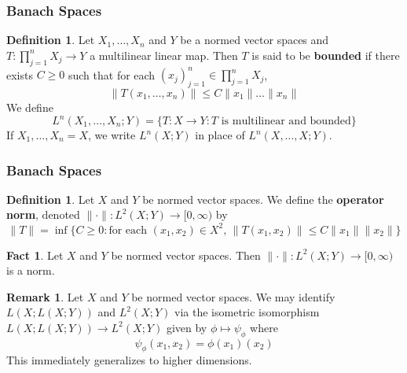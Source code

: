 \documentclass[notheorems]{beamer}
\theoremstyle{definition}
\newtheorem{defn}[definition]{Definition}
\newtheorem{fact}[definition]{Fact}
\newtheorem{rem}[definition]{Remark}
\begin{document}
	
	
	
	
	
	
	
	
	
	
	
	
	
	
	
	
	
	
	\begin{frame}
	\frametitle{Banach Spaces}
	
	\begin{defn}
		Let $X_1, \dots, X_n$ and $Y$ be a normed vector spaces and $T:\prod\limits_{j=1}^n X_j \rightarrow Y$ a multilinear linear map. Then $T$ is said to be \textbf{bounded} if there exists $C \geq 0$ such that for each $(x_j)_{j=1}^n \in \prod\limits_{j=1}^n X_j$, $$\|T(x_1, \dots, x_n) \|\leq C \|x_1 \| \dots \|x_n\|$$ 
		We define $$L^n(X_1, \dots, X_n; Y) = \{T:X \rightarrow Y: T \text{ is multilinear and bounded}\}$$ 
		If $X_1, \dots, X_n = X$, we write $L^n(X;Y)$ in place of  $L^n(X, \dots, X; Y)$.
	\end{defn}
	
	\end{frame}
	
	
	
	
	
	

	
	
	
	
	
	
	
	
	
	
	
	
	
	
	
	
	\begin{frame}
	\frametitle{Banach Spaces}
	
	\begin{defn}
	Let $X$ and $Y$ be normed vector spaces. We define the \textbf{operator norm}, denoted $\|\cdot\|: L^2(X;Y) \rightarrow [0, \infty)$ by $$\|T\| = \inf \{C \geq 0: \text{for each } (x_1, x_2) \in X^2 \text{, } \|T(x_1, x_2) \|\leq C\|x_1\|\|x_2\|\}$$
	\end{defn}
	
	
	\pause
	\begin{fact}
	Let $X$ and $Y$ be normed vector spaces. Then $\|\cdot\|: L^2(X;Y) \rightarrow [0, \infty)$ is a norm.
	\end{fact}
	
	
	\pause
	\begin{rem}
	Let $X$ and $Y$ be normed vector spaces. We may identify $L(X; L(X;  Y))$ and $L^2(X; Y)$ via the isometric isomorphism $L(X; L(X;  Y)) \rightarrow L^2(X;Y)$ given by $\phi \mapsto \psi_{\phi}$ where $$\psi_{\phi}(x_1, x_2) = \phi(x_1)(x_2)$$ 
	This immediately generalizes to higher dimensions.
	\end{rem}

	\end{frame}
	
\end{document}
